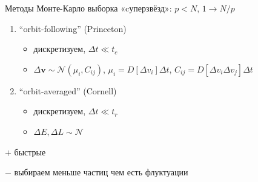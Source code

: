\documentclass{beamer}
\let \v = \symbf
\begin{document}
    \begin{frame}{Методы Монте-Карло}
      выборка «cуперзвёзд»: $p < N$, $1 \to N/p$
      \begin{enumerate}
        \item ``orbit-following'' (Princeton)
        \begin{itemize}
          \item дискретизуем, $Δt \ll t_c$
          \item $Δ{\v v} \sim \mathcal N({\mu_i, C_{ij}}) $,
            $\mu_i = D[Δv_i]Δt$, $C_{ij} = D[Δv_iΔv_j]Δt$
        \end{itemize}
        \item ``orbit-averaged'' (Cornell)
        \begin{itemize}
          \item дискретизуем, $Δt \ll t_r$
          \item $ΔE,ΔL \sim \mathcal N$
        \end{itemize}
    \end{enumerate}

    
      \begin{exampleblock}{$+$}
        быстрые
      \end{exampleblock}
      \begin{alertblock}{$-$}
        выбираем меньше частиц чем есть \so флуктуации
      \end{alertblock}
    \end{frame}
\end{document}

